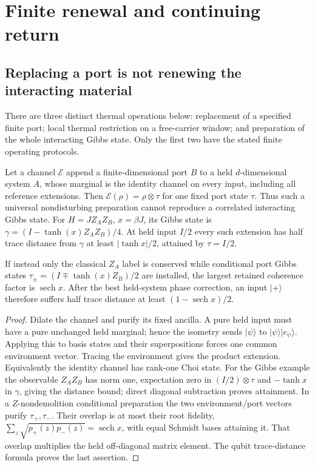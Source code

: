 \section{Finite renewal and continuing return}
\label{sec:finite-renewal}

\subsection{Replacing a port is not renewing the interacting material}

There are three distinct thermal operations below: replacement of a
specified finite port; local thermal restriction on a free-carrier
window; and preparation of the whole interacting Gibbs state.
Only the first two have the stated finite operating protocols.

\begin{proposition}
\label{prop:thermal-product-obstruction}
Let a channel $\mathcal E$ append a finite-dimensional port $B$ to a
held $d$-dimensional system $A$, whose marginal is the identity channel
on every input, including all reference extensions. Then
$\mathcal E(\rho)=\rho\otimes\tau$ for one fixed port state $\tau$.
Thus such a universal nondisturbing preparation cannot reproduce a
correlated interacting Gibbs state.
For $H=JZ_AZ_B$, $x=\beta J$, its Gibbs state is
$\gamma=(I-\tanh(x)Z_AZ_B)/4$. At held input $I/2$ every such
extension has half trace distance from $\gamma$ at least
$|\tanh x|/2$, attained by $\tau=I/2$.

If instead only the classical $Z_A$ label is conserved while conditional
port Gibbs states $\tau_\pm=(I\mp\tanh(x)Z_B)/2$ are installed, the
largest retained coherence factor is $\operatorname{sech}x$.
After the best held-system phase correction, an input $|+\rangle$
therefore suffers half trace distance at least
$(1-\operatorname{sech}x)/2$.
\end{proposition}
\begin{proof}
Dilate the channel and purify its fixed ancilla. A pure held input
must have a pure unchanged held marginal; hence the isometry sends
$|\psi\rangle$ to $|\psi\rangle|e_\psi\rangle$.
Applying this to basis states and their superpositions forces one
common environment vector. Tracing the environment gives the product
extension. Equivalently the identity channel has rank-one Choi state.
For the Gibbs example the observable $Z_AZ_B$ has norm one,
expectation zero in $(I/2)\otimes\tau$ and $-\tanh x$ in $\gamma$,
giving the distance bound; direct diagonal subtraction proves attainment.
In a $Z$-nondemolition conditional preparation the two environment/port
vectors purify $\tau_+,\tau_-$. Their overlap is at most their root
fidelity, $\sum_z\sqrt{p_+(z)p_-(z)}=\operatorname{sech}x$,
with equal Schmidt bases attaining it. That overlap multiplies the
held off-diagonal matrix element. The qubit trace-distance formula
proves the last assertion.
\end{proof}

